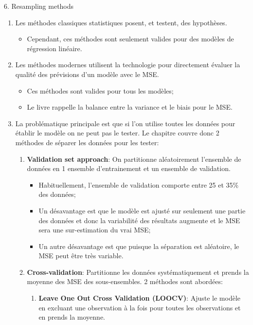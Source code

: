 \documentclass[12pt, titlepage, french]{report}
\begin{document}
\begin{CHPT_SUMM}{6. Resampling methods}
\begin{enumerate}
	\item	Les méthodes classiques statistiques posent, et testent, des hypothèses.
	\begin{itemize}
		\item	Cependant, ces méthodes sont seulement valides pour des modèles de régression linéaire.
	\end{itemize}
	\item	Les méthodes modernes utilisent la technologie pour directement évaluer la qualité des prévisions d'un modèle avec le MSE.
	\begin{itemize}
		\item	Ces méthodes sont valides pour tous les modèles;
		\item	Le livre rappelle la balance entre la variance et le biais pour le MSE.
	\end{itemize}
	\item	La problématique principale est que si l'on utilise toutes les données pour établir le modèle on ne peut pas le tester. Le chapitre couvre donc 2 méthodes de séparer les données pour les tester:
	\begin{enumerate}
		\item	\textbf{Validation set approach}: On partitionne aléatoirement l'ensemble de données en 1 ensemble d'entrainement et un ensemble de validation.
		\begin{itemize}
			\item	Habituellement, l'ensemble de validation comporte entre 25 et 35\% des données;
			\item	Un désavantage est que le modèle est ajusté sur seulement une partie des données et donc la variabilité des résultats augmente et le MSE sera une sur-estimation du vrai MSE;
			\item	Un autre désavantage est que puisque la séparation est aléatoire, le MSE peut être très variable.
		\end{itemize}
		\item	\textbf{Cross-validation}: Partitionne les données systématiquement et prends la moyenne des MSE des sous-ensembles. 2 méthodes sont abordées:
		\begin{enumerate}
			\item	\textbf{Leave One Out Cross Validation (LOOCV)}: Ajuste le modèle en excluant une observation à la fois pour toutes les observations et en prends la moyenne.

\end{enumerate}
\end{enumerate}
\end{enumerate}
\end{CHPT_SUMM}
\end{document}
